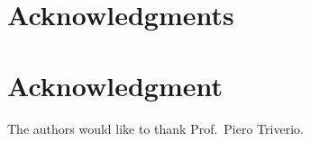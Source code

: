 \documentclass[12pt,journal,compsoc]{../ieeepaper/IEEEtran}
\begin{document}
%




\ifCLASSOPTIONcompsoc
  \section*{Acknowledgments}
\else
  \section*{Acknowledgment}
\fi


The authors would like to thank Prof.\ Piero Triverio.


\ifCLASSOPTIONcaptionsoff
  \newpage
\fi





%
%
%
%
%
\end{document}
